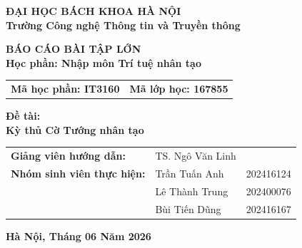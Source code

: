 \begin{titlepage}
\begin{center}
    {\large \bfseries ĐẠI HỌC BÁCH KHOA HÀ NỘI} \\
    {\large \bfseries Trường Công nghệ Thông tin và Truyền thông} \\
    
    \vspace{2cm}
    \vspace{1.5cm}
    
    {\Large \bfseries BÁO CÁO BÀI TẬP LỚN} \\
    {\Large \bfseries Học phần: Nhập môn Trí tuệ nhân tạo}

    \begin{table}[h]
      \centering
      \begin{tabular}{ll}
        \textbf{Mã học phần: IT3160} & \textbf{Mã lớp học: 167855}
      \end{tabular}
    \end{table}
    \vspace{1cm}
    
    {\large \bfseries Đề tài:} \\
    \vspace{0.5cm}
    {\Large \bfseries Kỳ thủ Cờ Tướng nhân tạo} \\
    
    \vspace{2cm}
    \begin{table}[h]
        \centering
        \begin{tabular}{lll}
          \textbf{Giảng viên hướng dẫn:} & TS. Ngô Văn Linh  &\\
            \textbf{Nhóm sinh viên thực hiện:} & Trần Tuấn Anh &  202416124 \\
                                          & Lê Thành Trung & 202400076 \\
                                          & Bùi Tiến Dũng & 202416167 \\
        \end{tabular}
    \end{table}
    
    \vfill
    {\large \bfseries Hà Nội, Tháng 06 Năm 2026}
\end{center}
\end{titlepage}
\newpage
